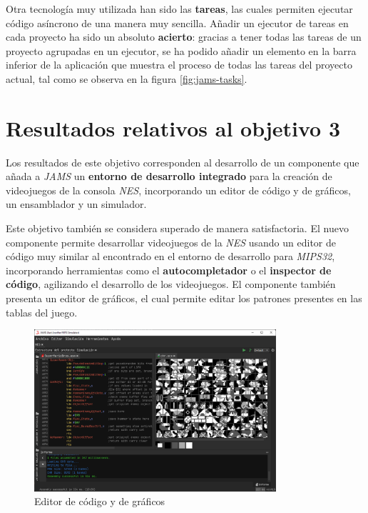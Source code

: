 Otra tecnología muy utilizada han sido las \textbf{tareas},
las cuales permiten ejecutar código asíncrono de una manera muy
sencilla.
Añadir un ejecutor de tareas en cada proyecto ha sido un
absoluto \textbf{acierto}: gracias a tener todas las tareas
de un proyecto agrupadas en un ejecutor, se ha podido añadir
un elemento en la barra inferior de la aplicación que muestra
el proceso de todas las tareas del proyecto actual,
tal como se observa en la figura \ref{fig:jams-tasks}.

\section{Resultados relativos al objetivo 3}\label{sec:resultados-relativos-al-objetivo-3}

Los resultados de este objetivo corresponden al desarrollo
de un componente que añada a \textit{JAMS} un \textbf{entorno de
desarrollo integrado} para la creación de videojuegos de la
consola \textit{NES}, incorporando un editor de código
y de gráficos, un ensamblador y un simulador.

Este objetivo también se considera superado de manera satisfactoria.
El nuevo componente permite desarrollar videojuegos de
la \textit{NES} usando un editor de código muy similar al encontrado
en el entorno de desarrollo para \textit{MIPS32}, incorporando
herramientas como el \textbf{autocompletador} o el \textbf{inspector de código},
agilizando el desarrollo de los videojuegos.
El componente también presenta un editor de gráficos, el cual permite
editar los patrones presentes en las tablas del juego.

\begin{figure}[h]
    \centering
    \includegraphics[width=0.8\textwidth]{images/results/nes-editor}
    \caption{Editor de código y de gráficos}
    \label{fig:nes-result-editor}
\end{figure}

